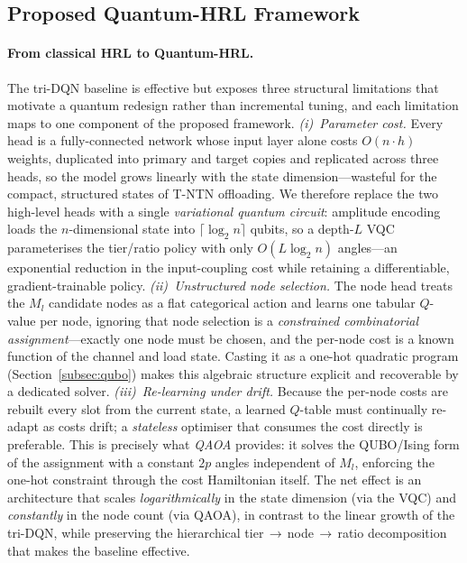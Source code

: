 \documentclass[11pt,a4paper]{article}
\theoremstyle{definition}
\begin{document}
\subsection{Proposed Quantum-HRL Framework}
\label{subsec:qhrl}

\paragraph{From classical HRL to Quantum-HRL.}
The tri-DQN baseline is effective but exposes three structural limitations that motivate a quantum redesign rather than incremental tuning, and each limitation maps to one component of the proposed framework. \emph{(i)~Parameter cost.} Every head is a fully-connected network whose input layer alone costs $O(n\cdot h)$ weights, duplicated into primary and target copies and replicated across three heads, so the model grows linearly with the state dimension---wasteful for the compact, structured states of T-NTN offloading. We therefore replace the two high-level heads with a single \emph{variational quantum circuit}: amplitude encoding loads the $n$-dimensional state into $\lceil\log_2 n\rceil$ qubits, so a depth-$L$ VQC parameterises the tier/ratio policy with only $O(L\log_2 n)$ angles---an exponential reduction in the input-coupling cost while retaining a differentiable, gradient-trainable policy. \emph{(ii)~Unstructured node selection.} The node head treats the $M_l$ candidate nodes as a flat categorical action and learns one tabular $Q$-value per node, ignoring that node selection is a \emph{constrained combinatorial assignment}---exactly one node must be chosen, and the per-node cost is a known function of the channel and load state. Casting it as a one-hot quadratic program (Section~\ref{subsec:qubo}) makes this algebraic structure explicit and recoverable by a dedicated solver. \emph{(iii)~Re-learning under drift.} Because the per-node costs are rebuilt every slot from the current state, a learned $Q$-table must continually re-adapt as costs drift; a \emph{stateless} optimiser that consumes the cost directly is preferable. This is precisely what \emph{QAOA} provides: it solves the QUBO/Ising form of the assignment with a constant $2p$ angles independent of $M_l$, enforcing the one-hot constraint through the cost Hamiltonian itself. The net effect is an architecture that scales \emph{logarithmically} in the state dimension (via the VQC) and \emph{constantly} in the node count (via QAOA), in contrast to the linear growth of the tri-DQN, while preserving the hierarchical tier\,$\to$\,node\,$\to$\,ratio decomposition that makes the baseline effective.
\end{document}
